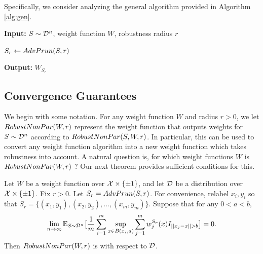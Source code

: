 Specifically, we consider analyzing the general algorithm provided in Algorithm \ref{alg:gen}.


\begin{algorithm}[H]
    \SetAlgoLined
    {\bfseries Input:} $S \sim {\mathcal D}^n$, weight function $W$, robustness radius $r$\;
    
    $S_r \leftarrow AdvPrun(S, r)$\;
    
    {\bfseries Output:} $W_{S_r}$\;
    

\caption{\ga}\label{alg:gen}
\end{algorithm}

\subsection{Convergence Guarantees}

We begin with some notation. For any weight function $W$ and radius $r > 0$, we let $RobustNonPar(W,r)$ represent the weight function that outputs weights for $S \sim {\mathcal D}^n$ according to $RobustNonPar(S, W, r)$. In particular, this can be used to convert any weight function algorithm into a new weight function which takes robustness into account. A natural question is, for which weight functions $W$ is $RobustNonPar(W,r)$ \rcons? Our next theorem provides sufficient conditions for this.

\begin{thm}\label{thm_weight_general}
Let $W$ be a weight function over $\mathcal X \times \{\pm 1\}$, and let ${\mathcal D}$ be a distribution over $\mathcal X \times \{\pm 1\}$. Fix $r >0$. Let $S_r = AdvPrun(S, r)$.  For convenience, relabel $x_i, y_i$ so that $S_r = \{(x_1, y_1), (x_2, y_2), \dots, (x_m, y_m)\}$. Suppose that for any $0 < a < b,$ 
\begin{equation*}\label{condition}
\lim_{n \to \infty} \mathbb{E}_{S \sim {\mathcal D}^n}\big [ \frac{1}{m} \sum_{i = 1}^m \sup_{x \in B(x_i, a)} \sum_{j = 1}^m w_j^{S_r}(x)I_{||x_j - x|| > b} \big] = 0. 
\end{equation*}
Then $RobustNonPar(W,r)$ is \rcons\emph{ }with respect to ${\mathcal D}$. 
\end{thm}

